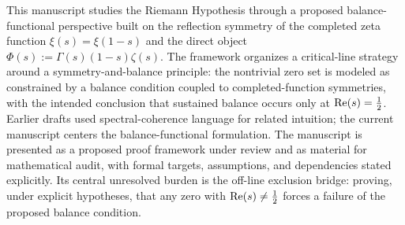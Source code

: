 This manuscript studies the Riemann Hypothesis through a proposed balance-functional perspective built on the reflection symmetry of the completed zeta function $\xi(s)=\xi(1-s)$ and the direct object $\Phi(s):=\Gamma(s)(1-s)\zeta(s)$. The framework organizes a critical-line strategy around a symmetry-and-balance principle: the nontrivial zero set is modeled as constrained by a balance condition coupled to completed-function symmetries, with the intended conclusion that sustained balance occurs only at $\operatorname{Re}(s)=\tfrac12$. Earlier drafts used spectral-coherence language for related intuition; the current manuscript centers the balance-functional formulation. The manuscript is presented as a proposed proof framework under review and as material for mathematical audit, with formal targets, assumptions, and dependencies stated explicitly. Its central unresolved burden is the off-line exclusion bridge: proving, under explicit hypotheses, that any zero with $\operatorname{Re}(s)\neq\tfrac12$ forces a failure of the proposed balance condition.
